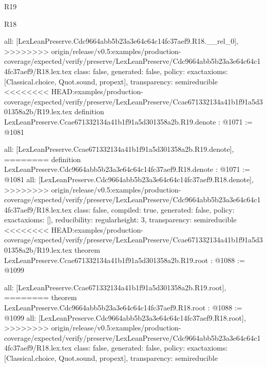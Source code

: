 \begin{lexlean}{R19}
\begin{lexlean}{R18}
\begin{coremodule}
{{{{{{{{{{{{  all: [LexLeanPreserve.Cdc9664abb5b23a3e64c64c14fc37aef9.R18.__rel_0],
>>>>>>>> origin/release/v0.5:examples/production-coverage/expected/verify/preserve/LexLeanPreserve/Cdc9664abb5b23a3e64c64c14fc37aef9/R18.lex.tex
  class: false,
  generated: false,
  policy: exact{axioms: [Classical.choice, Quot.sound, propext]},
  transparency: semireducible
}
<<<<<<<< HEAD:examples/production-coverage/expected/verify/preserve/LexLeanPreserve/Ccae671332134a41b1f91a5d301358a2b/R19.lex.tex
definition LexLeanPreserve.Ccae671332134a41b1f91a5d301358a2b.R19.denote : @1071 := @1081 {
  all: [LexLeanPreserve.Ccae671332134a41b1f91a5d301358a2b.R19.denote],
========
definition LexLeanPreserve.Cdc9664abb5b23a3e64c64c14fc37aef9.R18.denote : @1071 := @1081 {
  all: [LexLeanPreserve.Cdc9664abb5b23a3e64c64c14fc37aef9.R18.denote],
>>>>>>>> origin/release/v0.5:examples/production-coverage/expected/verify/preserve/LexLeanPreserve/Cdc9664abb5b23a3e64c64c14fc37aef9/R18.lex.tex
  class: false,
  compiled: true,
  generated: false,
  policy: exact{axioms: []},
  reducibility: regular{height: 3},
  transparency: semireducible
}
<<<<<<<< HEAD:examples/production-coverage/expected/verify/preserve/LexLeanPreserve/Ccae671332134a41b1f91a5d301358a2b/R19.lex.tex
theorem LexLeanPreserve.Ccae671332134a41b1f91a5d301358a2b.R19.root : @1088 := @1099 {
  all: [LexLeanPreserve.Ccae671332134a41b1f91a5d301358a2b.R19.root],
========
theorem LexLeanPreserve.Cdc9664abb5b23a3e64c64c14fc37aef9.R18.root : @1088 := @1099 {
  all: [LexLeanPreserve.Cdc9664abb5b23a3e64c64c14fc37aef9.R18.root],
>>>>>>>> origin/release/v0.5:examples/production-coverage/expected/verify/preserve/LexLeanPreserve/Cdc9664abb5b23a3e64c64c14fc37aef9/R18.lex.tex
  class: false,
  generated: false,
  policy: exact{axioms: [Classical.choice, Quot.sound, propext]},
  transparency: semireducible
}

}}}}}}}}}}}}}
\end{coremodule}
\end{lexlean}
\end{lexlean}
